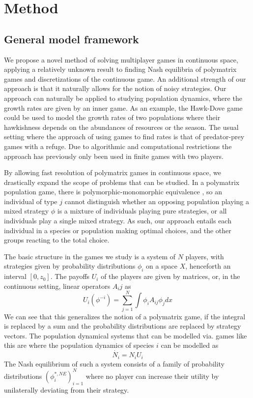 \section{Method}
\subsection*{General model framework}
We propose a novel method of solving multiplayer games in continuous space, applying a relatively unknown result to finding Nash equilibria of polymatrix games and discretizations of the continuous game. An additional strength of our approach is that it naturally allows for the notion of noisy strategies. Our approach can naturally be applied to studying population dynamics, where the growth rates are given by an inner game. As an example, the Hawk-Dove game could be used to model the growth rates of two populations where their hawkishness depends on the abundances of resources or the season. The usual setting where the approach of using games to find rates is that of predator-prey games with a refuge. Due to algorithmic and computational restrictions the approach has previously only been used in finite games with two players.

By allowing fast resolution of polymatrix games in continuous space, we drastically expand the scope of problems that can be studied. In a polymatrix population game, there is polymorphic-monomorphic equivalence \citep{cressmannbook}, so an individual of type $j$ cannot distinguish whether an opposing population playing a mixed strategy $\phi$ is a mixture of individuals playing pure strategies, or all individuals play a single mixed strategy. As such, our approach entails each individual in a species or population making optimal choices, and the other groups reacting to the total choice.

The basic structure in the games we study is a system of $N$ players, with strategies given by probability distributions $\phi_i$ on a space $X$, henceforth an interval $[0,z_0]$. The payoffs $U_i$ of the players are given by matrices, or, in the continuous setting, linear operators $A_ij$ as
\begin{equation}
  \label{eq:utility}
  U_i(\phi^{-i}) = \sum_{j=1}^N \int \phi_i A_{ij} \phi_j dx
\end{equation}
We can see that this generalizes the notion of a polymatrix game, if the integral is replaced by a sum and the probability distributions are replaced by strategy vectors. The population dynamical systems that can be modelled via. games like this are where the population dynamics of species $i$ can be modelled as
\begin{equation}
  \dot{N_i} = N_i U_i
\end{equation}
The Nash equilibrium of such a system consists of a family of probability distributions $(\phi_i^{*,NE})_{i=1}^N$ where no player can increase their utility by unilaterally deviating from their strategy.

